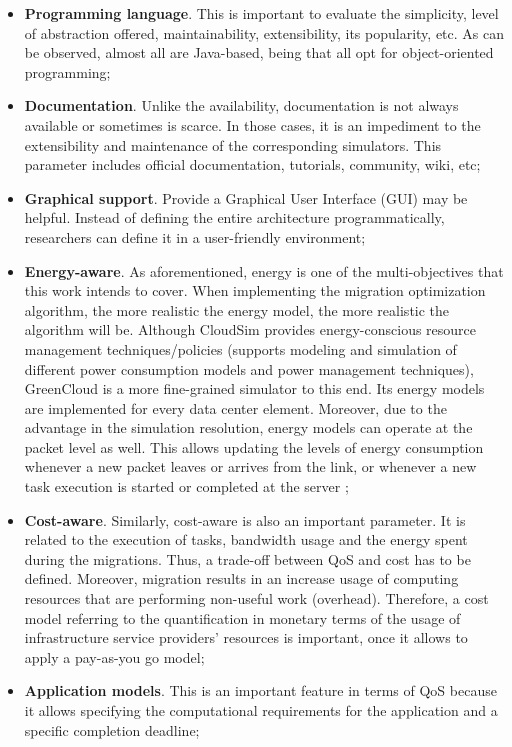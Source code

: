 \begin{itemize}[noitemsep]
\item \textbf{Programming language}. This is important to evaluate the simplicity, level of abstraction offered, maintainability, extensibility, its popularity, etc. As can be observed, almost all are Java-based, being that all opt for object-oriented programming;
\item \textbf{Documentation}. Unlike the availability, documentation is not always available or sometimes is scarce. In those cases, it is an impediment to the extensibility and maintenance of the corresponding simulators. This parameter includes official documentation, tutorials, community, wiki, etc;
\item \textbf{Graphical support}. Provide a Graphical User Interface (GUI) may be helpful. Instead of defining the entire architecture programmatically, researchers can define it in a user-friendly environment;
\item \textbf{Energy-aware}. As aforementioned, energy is one of the multi-objectives that this work intends to cover. When implementing the migration optimization algorithm, the more realistic the energy model, the more realistic the algorithm will be. Although CloudSim provides energy-conscious resource management techniques/policies (supports modeling and simulation of different power consumption models and power management techniques), GreenCloud is a more fine-grained simulator to this end. Its energy models are implemented for every data center element. Moreover, due to the advantage in the simulation resolution, energy models can operate at the packet level as well. This allows updating the levels of energy consumption whenever a new packet leaves or arrives from the link, or whenever a new task execution is started or completed at the server \cite{kliazovich2012greencloud};
\item \textbf{Cost-aware}. Similarly, cost-aware is also an important parameter. It is related to the execution of tasks, bandwidth usage and the energy spent during the migrations. Thus, a trade-off between QoS and cost has to be defined. Moreover, migration results in an increase usage of computing resources that are performing non-useful work (overhead). Therefore, a cost model referring to the quantification in monetary terms of the usage of infrastructure service providers' resources is important, once it allows to apply a pay-as-you go model;
\item \textbf{Application models}. This is an important feature in terms of QoS because it allows specifying the computational requirements for the application and a specific completion deadline;

\end{itemize}
